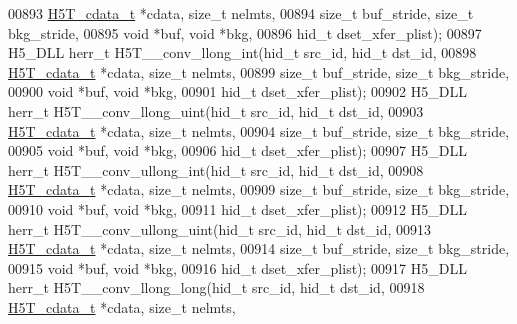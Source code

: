 \begin{DoxyCode}
00893                       \hyperlink{struct_h5_t__cdata__t}{H5T\_cdata\_t} *cdata, \textcolor{keywordtype}{size\_t} nelmts,
00894                       \textcolor{keywordtype}{size\_t} buf\_stride, \textcolor{keywordtype}{size\_t} bkg\_stride,
00895                                       \textcolor{keywordtype}{void} *buf, \textcolor{keywordtype}{void} *bkg,
00896                                       hid\_t dset\_xfer\_plist);
00897 H5\_DLL herr\_t H5T\_\_conv\_llong\_int(hid\_t src\_id, hid\_t dst\_id,
00898                   \hyperlink{struct_h5_t__cdata__t}{H5T\_cdata\_t} *cdata, \textcolor{keywordtype}{size\_t} nelmts,
00899                   \textcolor{keywordtype}{size\_t} buf\_stride, \textcolor{keywordtype}{size\_t} bkg\_stride,
00900                                   \textcolor{keywordtype}{void} *buf, \textcolor{keywordtype}{void} *bkg,
00901                                   hid\_t dset\_xfer\_plist);
00902 H5\_DLL herr\_t H5T\_\_conv\_llong\_uint(hid\_t src\_id, hid\_t dst\_id,
00903                    \hyperlink{struct_h5_t__cdata__t}{H5T\_cdata\_t} *cdata, \textcolor{keywordtype}{size\_t} nelmts,
00904                    \textcolor{keywordtype}{size\_t} buf\_stride, \textcolor{keywordtype}{size\_t} bkg\_stride,
00905                                    \textcolor{keywordtype}{void} *buf, \textcolor{keywordtype}{void} *bkg,
00906                                    hid\_t dset\_xfer\_plist);
00907 H5\_DLL herr\_t H5T\_\_conv\_ullong\_int(hid\_t src\_id, hid\_t dst\_id,
00908                    \hyperlink{struct_h5_t__cdata__t}{H5T\_cdata\_t} *cdata, \textcolor{keywordtype}{size\_t} nelmts,
00909                    \textcolor{keywordtype}{size\_t} buf\_stride, \textcolor{keywordtype}{size\_t} bkg\_stride,
00910                                    \textcolor{keywordtype}{void} *buf, \textcolor{keywordtype}{void} *bkg,
00911                                    hid\_t dset\_xfer\_plist);
00912 H5\_DLL herr\_t H5T\_\_conv\_ullong\_uint(hid\_t src\_id, hid\_t dst\_id,
00913                     \hyperlink{struct_h5_t__cdata__t}{H5T\_cdata\_t} *cdata, \textcolor{keywordtype}{size\_t} nelmts,
00914                     \textcolor{keywordtype}{size\_t} buf\_stride, \textcolor{keywordtype}{size\_t} bkg\_stride,
00915                                     \textcolor{keywordtype}{void} *buf, \textcolor{keywordtype}{void} *bkg,
00916                                     hid\_t dset\_xfer\_plist);
00917 H5\_DLL herr\_t H5T\_\_conv\_llong\_long(hid\_t src\_id, hid\_t dst\_id,
00918                    \hyperlink{struct_h5_t__cdata__t}{H5T\_cdata\_t} *cdata, \textcolor{keywordtype}{size\_t} nelmts,

\end{DoxyCode}
